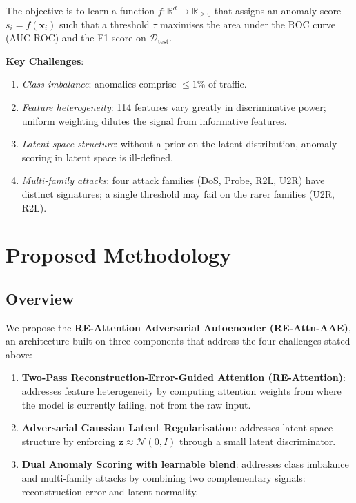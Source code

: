 \documentclass[12pt,a4paper]{article}
\begin{document}
The objective is to learn a function
$f: \mathbb{R}^{d} \rightarrow \mathbb{R}_{\geq 0}$ that assigns an anomaly
score $s_i = f(\mathbf{x}_i)$ such that a threshold $\tau$ maximises
the area under the ROC curve (AUC-ROC) and the F1-score on
$\mathcal{D}_{\text{test}}$.

\noindent\textbf{Key Challenges}:
\begin{enumerate}[leftmargin=2em]
    \item \textit{Class imbalance}: anomalies comprise $\leq 1\%$ of traffic.
    \item \textit{Feature heterogeneity}: 114 features vary greatly in
          discriminative power; uniform weighting dilutes the signal from
          informative features.
    \item \textit{Latent space structure}: without a prior on the latent
          distribution, anomaly scoring in latent space is ill-defined.
    \item \textit{Multi-family attacks}: four attack families (DoS, Probe,
          R2L, U2R) have distinct signatures; a single threshold may fail on
          the rarer families (U2R, R2L).
\end{enumerate}

\section{Proposed Methodology}

\subsection{Overview}

We propose the \textbf{RE-Attention Adversarial Autoencoder (RE-Attn-AAE)},
an architecture built on three components that address the four challenges stated
above:

\begin{enumerate}[leftmargin=2em]
    \item \textbf{Two-Pass Reconstruction-Error-Guided Attention (RE-Attention)}:
          addresses feature heterogeneity by computing attention weights from
          where the model is currently failing, not from the raw input.
    \item \textbf{Adversarial Gaussian Latent Regularisation}: addresses latent
          space structure by enforcing $\mathbf{z} \approx \mathcal{N}(0, I)$
          through a small latent discriminator.
    \item \textbf{Dual Anomaly Scoring with learnable blend}: addresses class
          imbalance and multi-family attacks by combining two complementary
          signals: reconstruction error and latent normality.
\end{enumerate}
\end{document}
